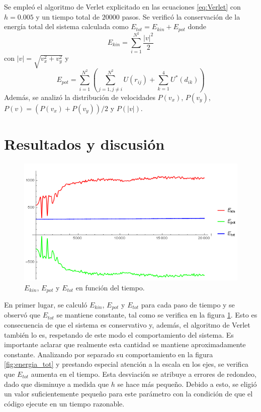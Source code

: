 \documentclass[aps,prb,twocolumn,superscriptaddress,floatfix,longbibliography]{revtex4-2}
\newif\ifptitle
\newif\ifpnumber
\newcounter{para}
\newcommand\ptitle[1]{\par\refstepcounter{para}
{\ifpnumber{\noindent\textcolor{lightgray}{\textbf{\thepara}}\indent}\fi}
{\ifptitle{\textbf{[{#1}]}}\fi}}
\begin{document}
Se empleó el algoritmo de Verlet explicitado en las ecuaciones \ref{eq:Verlet} con $h = 0.005$ y un tiempo total de $20000$ pasos. Se verificó la conservación de la energía total del sistema calculada como $E_{tot} = E_{kin} + E_{pot}$ donde
\[E_{kin} = \sum_{i = 1}^{N^2} \frac{|v|^2}{2}\]
con $|v| = \sqrt{v_x^2 + v_y^2}$ y
\[E_{pot} = \sum_{i=1}^{N^2} \left( \sum_{j = 1, j \neq i}^{N^2} U(r_{ij})  + \sum_{k=1}^{4} U^*(d_{ik}) \right) \]
Además, se analizó la distribución de velocidades $P(v_x)$, $P(v_y)$, $P(v) = (P(v_x) + P(v_y))/2$ y $P(|v|)$.

\section{Resultados y discusión}

\ptitle{Conservación de la energía}

\begin{figure}[h]
    \includegraphics[clip=true,width=0.75\columnwidth]{energias.png}
    \caption{$E_{kin}$, $E_{pot}$ y $E_{tot}$ en función del tiempo.}
     \label{fig:energias}
\end{figure}

En primer lugar, se calculó $E_{kin}$, $E_{pot}$ y $E_{tot}$ para cada paso de tiempo y se observó que $E_{tot}$ se mantiene constante, tal como se verifica en la figura \ref{fig:energias}. Esto es consecuencia de que el sistema es conservativo y, además, el algoritmo de Verlet también lo es, respetando de este modo el comportamiento del sistema. Es importante aclarar que realmente esta cantidad se mantiene aproximadamente constante. Analizando por separado su comportamiento en la figura \ref{fig:energia_tot} y prestando especial atención a la escala en los ejes, se verifica que $E_{tot}$ aumenta en el tiempo. Esta desviación se atribuye a errores de redondeo, dado que disminuye a medida que $h$ se hace más pequeño. Debido a esto, se eligió un valor suficientemente pequeño para este parámetro con la condición de que el código ejecute en un tiempo razonable.
\end{document}
